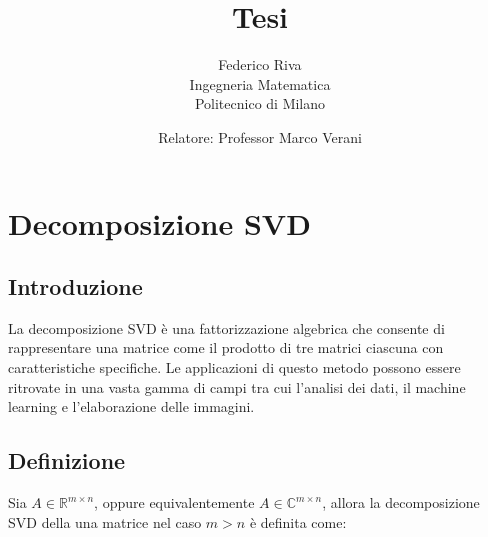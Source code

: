 \documentclass[11pt]{article}
\begin{document}
\title{Tesi}
\author{Federico Riva\\Ingegneria Matematica\\Politecnico di Milano}
\date{Relatore: Professor Marco Verani}

\maketitle
\newpage
\tableofcontents
\newpage
\section{Decomposizione SVD}
\subsection{Introduzione}
La decomposizione SVD è una fattorizzazione algebrica che consente di rappresentare una matrice come il prodotto di tre matrici ciascuna con caratteristiche specifiche. Le applicazioni di questo metodo possono essere ritrovate in una vasta gamma di campi tra cui l'analisi dei dati, il machine learning e l'elaborazione delle immagini.


\subsection{Definizione}
Sia $A\in\mathbb{R}^{m\times n}$, oppure equivalentemente $A\in\mathbb{C}^{m\times n}$, allora la decomposizione SVD della una matrice nel caso $m>n$ è definita come:
\end{document}
